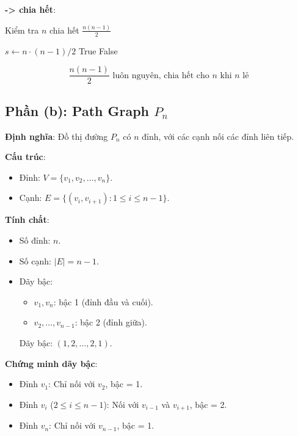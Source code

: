 \documentclass[a4paper,12pt]{article}
\theoremstyle{plain}
\theoremstyle{definition}
\begin{document}
\textbf{ -> chia hết}:
\begin{algorithm}
\caption{Kiểm tra \( n \) chia hết \( \frac{n(n-1)}{2} \)}
\begin{algorithmic}
    \State $s \gets n \cdot (n-1) / 2$
     \Return True
    \Else \Return False
    \EndIf
\EndFunction
\end{algorithmic}
\end{algorithm}

\[
\boxed{\frac{n(n-1)}{2} \text{ luôn nguyên, chia hết cho } n \text{ khi } n \text{ lẻ}}
\]

\subsection*{Phần (b): Path Graph \( P_n \)}

\textbf{Định nghĩa}: Đồ thị đường \( P_n \) có \( n \) đỉnh, với các cạnh nối các đỉnh liên tiếp.

\textbf{Cấu trúc}:
\begin{itemize}
    \item Đỉnh: \( V = \{v_1, v_2, \ldots, v_n\} \).
    \item Cạnh: \( E = \{(v_i, v_{i+1}) : 1 \leq i \leq n-1\} \).
\end{itemize}

\textbf{Tính chất}:
\begin{itemize}
    \item Số đỉnh: \( n \).
    \item Số cạnh: \( |E| = n-1 \).
    \item Dãy bậc:
    \begin{itemize}
        \item \( v_1, v_n \): bậc 1 (đỉnh đầu và cuối).
        \item \( v_2, \ldots, v_{n-1} \): bậc 2 (đỉnh giữa).
    \end{itemize}
    Dãy bậc: \( (1, 2, \ldots, 2, 1) \).
\end{itemize}

\textbf{Chứng minh dãy bậc}:
\begin{itemize}
    \item Đỉnh \( v_1 \): Chỉ nối với \( v_2 \), bậc = 1.
    \item Đỉnh \( v_i \) (\( 2 \leq i \leq n-1 \)): Nối với \( v_{i-1} \) và \( v_{i+1} \), bậc = 2.
    \item Đỉnh \( v_n \): Chỉ nối với \( v_{n-1} \), bậc = 1.
\end{itemize}
\end{document}
